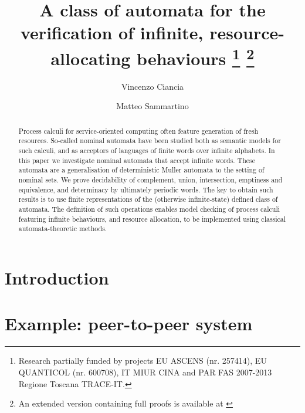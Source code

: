 \documentclass[orivec]{llncs}
\title{A class of automata for the verification of infinite, resource-allocating behaviours
\thanks{Research partially funded by projects EU 
 ASCENS (nr. 257414), EU QUANTICOL (nr. 600708), 
 IT MIUR CINA and PAR FAS 2007-2013 Regione Toscana TRACE-IT.}
 \thanks{An extended version containing full proofs is available at \cite{arxivCS}}
}
\author{Vincenzo Ciancia\inst{1} \and Matteo Sammartino\inst{2}}
\institute{ISTI-CNR, Pisa \and Dipartimento di Informatica, Universit\`a di Pisa, Pisa }
\begin{document}
\maketitle
    \begin{abstract}
Process calculi for service-oriented computing often feature generation of fresh resources. So-called nominal automata have been studied both as semantic models for such calculi, and as acceptors of languages of finite words over infinite alphabets. In this paper we investigate nominal automata that accept infinite words. These automata are a generalisation of deterministic Muller automata to the setting of nominal sets. We prove decidability of complement, union, intersection, emptiness and equivalence, and determinacy by ultimately periodic words. The key to obtain such results is to use finite representations of the (otherwise infinite-state) defined class of automata. The definition of such operations enables model checking of process calculi featuring infinite behaviours, and resource allocation, to be implemented using classical automata-theoretic methods.
% 
\end{abstract}

\section{Introduction}\label{sec:introduction}

\section{Example: peer-to-peer system}\label{sec:example}

\end{document}
